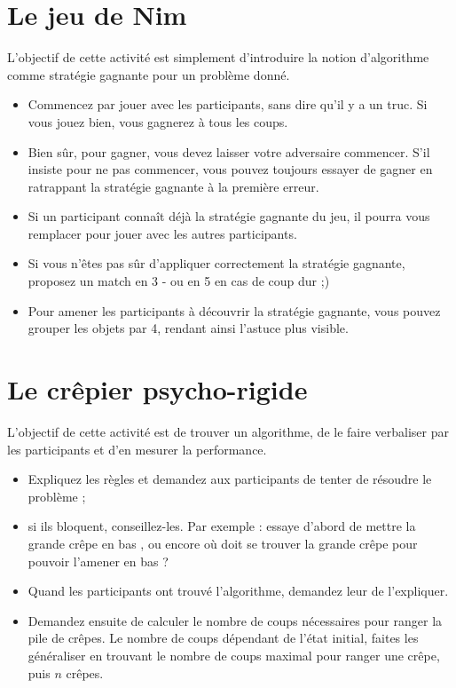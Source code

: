 \documentclass[a5paper,pagesize,DIV=14]{scrbook}
\begin{document}
\section*{Le jeu de Nim}

L'objectif de cette activité est simplement d'introduire la notion d'algorithme comme stratégie gagnante pour un problème donné.

\begin{itemize}
  \item Commencez par jouer avec les participants, sans dire qu'il y a un truc. Si vous jouez bien, vous gagnerez à tous les coups.
  \item Bien sûr, pour gagner, vous devez laisser votre adversaire commencer. S'il insiste pour ne pas commencer, vous pouvez toujours essayer de gagner en ratrappant la stratégie gagnante à la première erreur.
  \item Si un participant connaît déjà la stratégie gagnante du jeu, il pourra vous remplacer pour jouer avec les autres participants.
  \item Si vous n'êtes pas sûr d'appliquer correctement la stratégie gagnante, proposez un match en 3 - ou en 5 en cas de coup dur ;)
  \item Pour amener les participants à découvrir la stratégie gagnante, vous pouvez grouper les objets par 4, rendant ainsi l'astuce plus visible.
\end{itemize}

\section*{Le crêpier psycho-rigide}

L'objectif de cette activité est de trouver un algorithme, de le faire verbaliser par les participants et d'en mesurer la performance.

\begin{itemize}
  \item Expliquez les règles et demandez aux participants de tenter de résoudre le problème ;
  \item si ils bloquent, conseillez-les. Par exemple : \og essaye d'abord de mettre la grande crêpe en bas \fg, ou encore \og où doit se trouver la grande crêpe pour pouvoir l'amener en bas ? \fg
  \item Quand les participants ont trouvé l'algorithme, demandez leur de l'expliquer. 
  \item Demandez ensuite de calculer le nombre de coups nécessaires pour ranger la pile de crêpes. Le nombre de coups dépendant de l'état initial, faites les généraliser en trouvant le nombre de coups maximal pour ranger une crêpe, puis $n$ crêpes.
\end{itemize}
\end{document}
